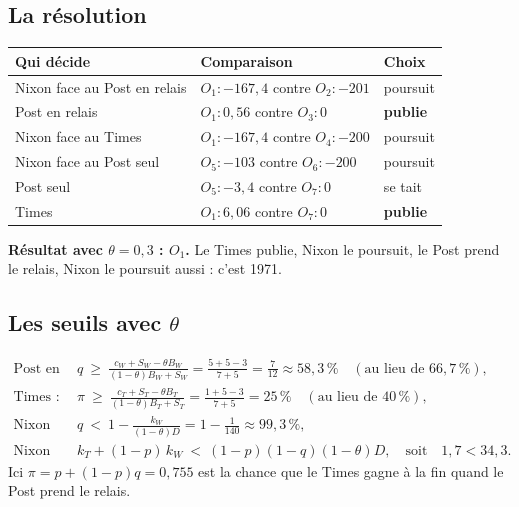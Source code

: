 \documentclass[11pt,a4paper]{article}
\theoremstyle{definition}
\newcommand{\T}[1]{\textcolor{nyt}{#1}}
\newcommand{\W}[1]{\textcolor{wp}{#1}}
\newcommand{\N}[1]{\textcolor{gov}{#1}}
\begin{document}
\subsection{La résolution}
\begin{center}
\small
\begin{tabular}{@{}lll@{}}
\toprule
Qui décide & Comparaison & Choix \\
\midrule
\N{Nixon} face au Post en relais & $O_1:-167,4$ contre $O_2:-201$ & poursuit \\
\W{Post} en relais & $O_1:0,56$ contre $O_3:0$ & \textbf{publie} \\
\N{Nixon} face au Times & $O_1:-167,4$ contre $O_4:-200$ & poursuit \\
\N{Nixon} face au Post seul & $O_5:-103$ contre $O_6:-200$ & poursuit \\
\W{Post} seul & $O_5:-3,4$ contre $O_7:0$ & se tait \\
\T{Times} & $O_1:6,06$ contre $O_7:0$ & \textbf{publie} \\
\bottomrule
\end{tabular}
\end{center}
\begin{resultat}
\textbf{Résultat avec $\theta=0,3$ : $O_1$.} Le Times publie, Nixon le poursuit, le Post prend le relais, Nixon le poursuit aussi : c'est 1971.
\end{resultat}

\subsection{Les seuils avec \texorpdfstring{$\theta$}{theta}}
\begin{align*}
\text{Post en relais :}\quad & q\ \ge\ \frac{c_W+S_W-\theta B_W}{(1-\theta)B_W+S_W}=\frac{5+5-3}{7+5}=\frac{7}{12}\approx58,3\,\%\quad(\text{au lieu de }66,7\,\%),\\[4pt]
\text{Times :}\quad & \pi\ \ge\ \frac{c_T+S_T-\theta B_T}{(1-\theta)B_T+S_T}=\frac{1+5-3}{7+5}=25\,\%\quad(\text{au lieu de }40\,\%),\\[4pt]
\text{Nixon contre le Post :}\quad & q\ <\ 1-\frac{k_W}{(1-\theta)D}=1-\frac{1}{140}\approx99,3\,\%,\\[4pt]
\text{Nixon contre le Times :}\quad & k_T+(1-p)\,k_W\ <\ (1-p)(1-q)(1-\theta)D,\quad\text{soit}\quad 1,7<34,3 .
\end{align*}
Ici $\pi=p+(1-p)q=0,755$ est la chance que le Times gagne à la fin quand le Post prend le relais.
\end{document}
